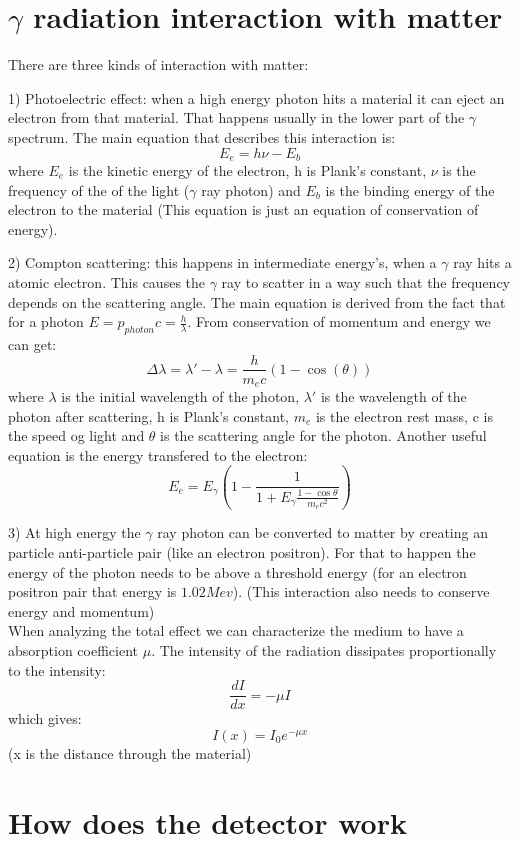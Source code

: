 \documentclass[]{article}
\begin{document}
\section{$\gamma$ radiation interaction with matter}

There are three kinds of interaction with matter:

1) Photoelectric effect: when a high energy photon hits a material it can eject an electron from that material. That happens usually in the lower part of the $\gamma$ spectrum. The main equation that describes this interaction is: $$E_e=h\nu-E_b$$ where $E_e$ is the kinetic energy of the electron, h is Plank's constant, $\nu$ is the frequency of the of the light ($\gamma$ ray photon) and $E_b$ is the binding energy of the electron to the material (This equation is just an equation of conservation of energy).

2) Compton scattering: this happens in intermediate energy's, when a $\gamma$ ray hits a atomic electron. This causes the $\gamma$ ray to scatter in a way such that the frequency depends on the scattering angle. The main equation is derived from the fact that for a photon $E=p_{photon}c=\frac{h}{\lambda}$. From conservation of momentum and energy we can get: $$\Delta \lambda =\lambda '-\lambda=\frac{h}{m_ec}(1-\cos(\theta))$$ where $\lambda$ is the initial wavelength of the photon, $\lambda'$ is the wavelength of the photon after scattering, h is Plank's constant, $m_e$ is the electron rest mass, c is the speed og light and $\theta$ is the scattering angle for the photon. Another useful equation is the energy transfered to the electron: $$E_e=E_\gamma \left(1-\frac{1}{1+E_\gamma \frac{1-\cos\theta}{m_ec^2}}\right)$$  

3) At high energy the $\gamma$ ray photon can be converted to matter by creating an particle anti-particle pair (like an electron positron). For that to happen the energy of the photon needs to be above a threshold energy (for an electron positron pair that energy is $1.02Mev$). (This interaction also needs to conserve energy and momentum)\\ 
When analyzing the total effect we can characterize the medium to have a absorption coefficient $\mu$. The intensity of the radiation dissipates proportionally to the intensity: $$\frac{dI}{dx}=-\mu I$$ which gives: $$I(x)=I_0e^{-\mu x}$$ (x is the distance through the material)

\section{How does the detector work}
\end{document}
